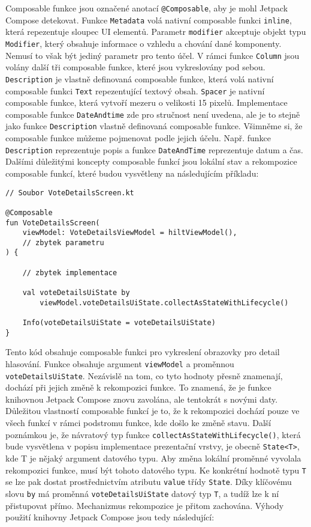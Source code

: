 \noindent Composable funkce jsou označené anotací \lstinline|@Composable|, aby je mohl Jetpack Compose detekovat. Funkce \lstinline|Metadata| volá nativní composable funkci \lstinline|inline|, která repezentuje sloupec UI elementů. Parametr \lstinline|modifier| akceptuje objekt typu \lstinline|Modifier|, který obsahuje informace o vzhledu a chování dané komponenty. Nemusí to však být jediný parametr pro tento účel. V rámci funkce \lstinline|Column| jsou volány další tři composable funkce, které jsou vykreslovány pod sebou. \lstinline|Description| je vlastně definovaná composable funkce, která volá nativní composable funkci \lstinline|Text| repezentující textový obsah. \lstinline|Spacer| je nativní composable funkce, která vytvoří mezeru o velikosti 15 pixelů. Implementace composable funkce \lstinline|DateAndtime| zde pro stručnost není uvedena, ale je to stejně jako funkce \lstinline|Description| vlastně definovaná composable funkce. Všimněme si, že composable funkce můžeme pojmenovat podle jejich účelu. Např. funkce \lstinline|Description| reprezentuje popis a funkce \lstinline|DateAndTime| reprezentuje datum a čas. Dalšími důležitými koncepty composable funkcí jsou lokální stav a rekompozice composable funkcí, které budou vysvětleny na následujícím příkladu:

\begin{lstlisting}[caption={Ukázka composable funkce}, label={lst:composable-example}, tabsize=2]
// Soubor VoteDetailsScreen.kt

@Composable
fun VoteDetailsScreen(
	viewModel: VoteDetailsViewModel = hiltViewModel(),
	// zbytek parametru
) {
	
	// zbytek implementace
	
	val voteDetailsUiState by 
		viewModel.voteDetailsUiState.collectAsStateWithLifecycle()
	
	Info(voteDetailsUiState = voteDetailsUiState)
}
\end{lstlisting}

\noindent Tento kód obsahuje composable funkci pro vykreslení obrazovky pro detail hlasování. Funkce obsahuje argument \lstinline|viewModel| a proměnnou \lstinline|voteDetailsUiState|. Nezávislě na tom, co tyto hodnoty přesně znamenají, dochází při jejich změně k rekompozici funkce. To znamená, že je funkce knihovnou Jetpack Compose znovu zavolána, ale tentokrát s novými daty. Důležitou vlastností composable funkcí je to, že k rekompozici dochází pouze ve všech funkcí v rámci podstromu funkce, kde došlo ke změně stavu. Další poznámkou je, že návratový typ funkce \lstinline|collectAsStateWithLifecycle()|, která bude vysvětlena v popisu implementace prezentační vrstvy, je obecně \lstinline|State<T>|, kde T je nějaký argument datového typu. Aby změna lokální proměnné vyvolala rekompozici funkce, musí být tohoto datového typu. Ke konkrétní hodnotě typu \lstinline|T| se lze pak dostat prostřednictvím atributu \lstinline|value| třídy \lstinline|State|. Díky klíčovému slovu \lstinline|by| má proměnná \lstinline|voteDetailsUiState| datový typ \lstinline|T|, a tudíž lze k ní přistupovat přímo. Mechanizmus rekompozice je přitom zachována. Výhody použití knihovny Jetpack Compose jsou tedy následující:

